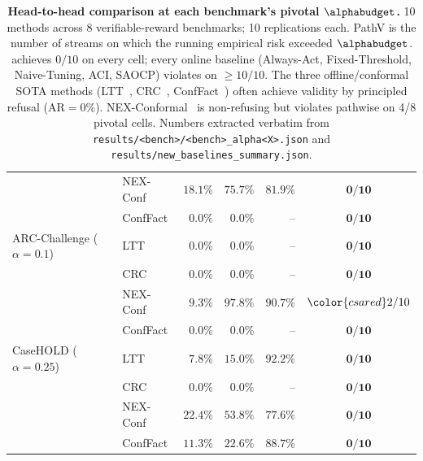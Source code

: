 \begin{table}[t]
\begin{tabular}{llrrrc}
 & NEX-Conf & $18.1\%$ & $75.7\%$ & $81.9\%$ & $\mathbf{0/10}$ \\
 & ConfFact & $0.0\%$ & $0.0\%$ & -- & $\mathbf{0/10}$ \\
\midrule
ARC-Challenge ($\alpha=0.1$) & LTT & $0.0\%$ & $0.0\%$ & -- & $\mathbf{0/10}$ \\
 & CRC & $0.0\%$ & $0.0\%$ & -- & $\mathbf{0/10}$ \\
 & NEX-Conf & $9.3\%$ & $97.8\%$ & $90.7\%$ & ${\color{csared}2/10}$ \\
 & ConfFact & $0.0\%$ & $0.0\%$ & -- & $\mathbf{0/10}$ \\
\midrule
CaseHOLD ($\alpha=0.25$) & LTT & $7.8\%$ & $15.0\%$ & $92.2\%$ & $\mathbf{0/10}$ \\
 & CRC & $0.0\%$ & $0.0\%$ & -- & $\mathbf{0/10}$ \\
 & NEX-Conf & $22.4\%$ & $53.8\%$ & $77.6\%$ & $\mathbf{0/10}$ \\
 & ConfFact & $11.3\%$ & $22.6\%$ & $88.7\%$ & $\mathbf{0/10}$ \\
\bottomrule
\end{tabular}
\caption{\textbf{Head-to-head comparison at each benchmark's pivotal $\alphabudget$.} 10 methods across 8 verifiable-reward benchmarks; 10 replications each. PathV is the number of streams on which the running empirical risk exceeded $\alphabudget$. \csa achieves $0/10$ on every cell; every online baseline (Always-Act, Fixed-Threshold, Naive-Tuning, ACI, SAOCP) violates on $\ge 10/10$. The three offline/conformal SOTA methods (LTT~\cite{ltt}, CRC~\cite{crc}, ConfFact~\cite{mohri}) often achieve validity by principled refusal ($\text{AR}=0\%$). NEX-Conformal~\cite{nexconf} is non-refusing but violates pathwise on 4/8 pivotal cells. Numbers extracted verbatim from \texttt{results/<bench>/<bench>\_alpha<X>.json} and \texttt{results/new\_baselines\_summary.json}.}
\label{tab:pivotal-head-to-head}
\label{tab:baseline-compare}
\end{table}
